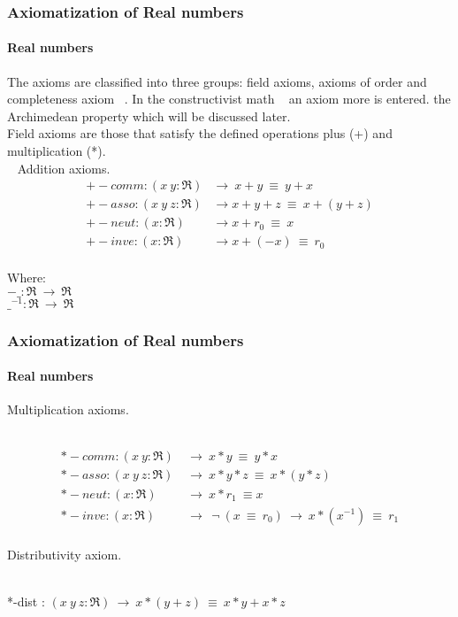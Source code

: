 \documentclass{beamer}
\begin{document}
\begin{frame}
\frametitle{Axiomatization of Real numbers}
\framesubtitle{Real numbers}
{ \rm The axioms are classified into three groups: field axioms, axioms of
order and completeness axiom ~\cite{Rosenlicht}. In the constructivist math
~\cite{Bridges1999} an axiom more is entered. the Archimedean property which
will be discussed later.
\\
Field axioms are those that satisfy the defined operations
plus (+) and multiplication (*).\\\
}
Addition axioms.
\\
\begin{align*}
  +-comm : (x\ y : \Re)    & \to ~ x + y ~\equiv\ y + x\\
  +-asso : (x\ y\ z : \Re) & \to x + y + z ~\equiv\ x + (y + z)\\
  +-neut : (x : \Re)       & \to    x + r_{0} ~\equiv\ x\\
  +-inve : (x : \Re)       & \to x + (- x) ~\equiv\ r_{0}
\end{align*}
\\
Where:
\\
$-\_  : \Re ~\to ~\Re$
\\
$\_ ^{-1} : \Re ~\to ~\Re$

\end{frame}

\begin{frame}
\frametitle{Axiomatization of Real numbers}
\framesubtitle{Real numbers}

Multiplication axioms.\\\

\begin{align*}
  *-comm : (x\ y : \Re)    & ~\to\ x * y\          \equiv\ y * x\\
  *-asso : (x\ y\ z : \Re) & ~\to\ x * y * z\      \equiv\ x * (y * z)\\
  *-neut : (x : \Re)       & ~\to\ x * r_{1}\       \equiv x\\
  *-inve : (x : \Re)       & ~\to\ ~\lnot\ (x~\equiv\ r_{0})~\to\ x * (x^{-1})\ \equiv\ r_{1}\\\
\end{align*}

Distributivity axiom.\\\

  *-dist : $(x\ y\ z : \Re) ~\to\ x * (y + z) ~\equiv\ x * y + x * z$

\end{frame}
\end{document}
